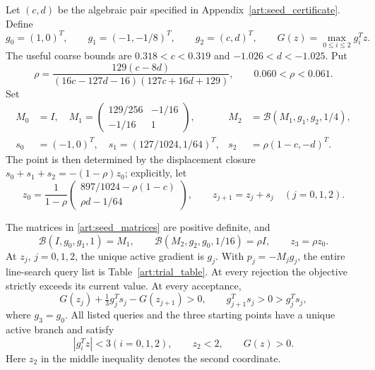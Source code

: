Let $(c,d)$ be the algebraic pair specified in
Appendix~\ref{art:seed_certificate}. Define
\[
 g_0=(1,0)^T,\qquad g_1=(-1,-1/8)^T,\qquad g_2=(c,d)^T,
 \qquad G(z)=\max_{0\le i\le2}g_i^Tz.
\]
The useful coarse bounds are $0.318<c<0.319$ and
$-1.026<d<-1.025$. Put
\begin{equation}\label{art:seed_rho}
 \rho=\frac{129(c-8d)}{(16c-127d-16)(127c+16d+129)},
 \qquad 0.060<\rho<0.061.
\end{equation}
Set
\begin{align}
 M_0&=I,\quad
 M_1=\begin{pmatrix}129/256&-1/16\\-1/16&1\end{pmatrix},
 &M_2&=\mathcal B(M_1,g_1,g_2,1/4),\label{art:seed_matrices}\\
 s_0&=(-1,0)^T,\quad s_1=(127/1024,1/64)^T,
 &s_2&=\rho(1-c,-d)^T.\label{art:seed_steps}
\end{align}
The point is then determined by the displacement closure
$s_0+s_1+s_2=-(1-\rho)z_0$; explicitly, let
\begin{equation}\label{art:seed_points}
 z_0=\frac1{1-\rho}
 \begin{pmatrix}897/1024-\rho(1-c)\\ \rho d-1/64\end{pmatrix},
 \qquad z_{j+1}=z_j+s_j\quad(j=0,1,2).
\end{equation}

\begin{lemma}\label{art:seed_cycle}
The matrices in \eqref{art:seed_matrices} are positive definite, and
\[
 \mathcal B(I,g_0,g_1,1)=M_1,\qquad
 \mathcal B(M_2,g_2,g_0,1/16)=\rho I,\qquad z_3=\rho z_0.
\]
At $z_j$, $j=0,1,2$, the unique active gradient is $g_j$.
With $p_j=-M_jg_j$, the entire line-search query list is
Table~\ref{art:trial_table}. At every rejection the objective strictly
exceeds its current value. At every acceptance,
\begin{equation}\label{art:seed_margins}
 G(z_j)+\tfrac13g_j^Ts_j-G(z_{j+1})>0,\qquad
 g_{j+1}^Ts_j>0>g_j^Ts_j,
\end{equation}
where $g_3=g_0$. All listed queries and the three starting points have a
unique active branch and satisfy
\begin{equation}\label{art:seed_query_bounds}
 |g_i^Tz|<3 (i=0,1,2),\qquad z_2<2,\qquad G(z)>0.
\end{equation}
Here $z_2$ in the middle inequality denotes the second coordinate.
\end{lemma}


